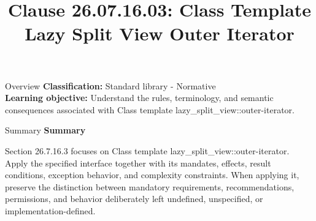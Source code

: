\documentclass[10pt,letterpaper]{article}
\title{Clause 26.07.16.03: Class Template Lazy Split View Outer Iterator}
\author{}
\date{}
\begin{document}
\maketitle
\begin{CornellOverviewBox}{Overview}
\textbf{Classification:} Standard library - Normative\\[2pt]
\textbf{Learning objective:} Understand the rules, terminology, and semantic consequences associated with Class template lazy\_split\_view::outer-iterator.
\end{CornellOverviewBox}\begin{CornellSummaryBox}{Summary}
{\sffamily\bfseries\color{Accent} Summary}\par\vspace{3pt}Section 26.7.16.3 focuses on Class template lazy\_split\_view::outer-iterator. Apply the specified interface together with its mandates, effects, result conditions, exception behavior, and complexity constraints. When applying it, preserve the distinction between mandatory requirements, recommendations, permissions, and behavior deliberately left undefined, unspecified, or implementation-defined.
\end{CornellSummaryBox}
\end{document}
